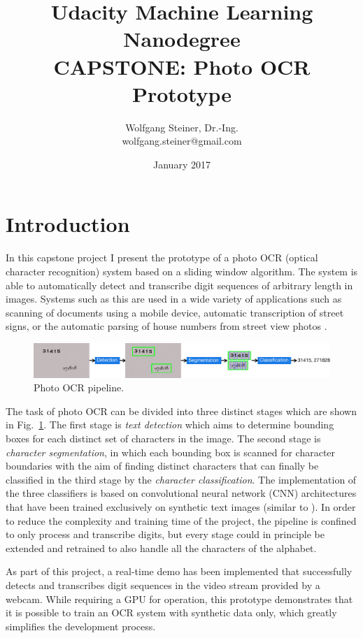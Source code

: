 \documentclass[12pt]{article}
\title{Udacity Machine Learning Nanodegree\\ CAPSTONE: Photo OCR Prototype}
\author{Wolfgang Steiner, Dr.-Ing. \\ \small{wolfgang.steiner@gmail.com}}
\date{January 2017}
\newcommand\figref[1]{Fig.~\ref{fig:#1}}
\begin{document}
\maketitle
\section{Introduction}
In this capstone project I present the prototype of a photo OCR (optical character recognition)
system based on a sliding window algorithm. The system is able to automatically detect and transcribe
digit sequences of arbitrary length in images. Systems such as this are used in a wide variety of applications
such as scanning of documents using a mobile device, automatic transcription of street signs, or
the automatic parsing of house numbers from street view photos \cite{Goodfellow2013}.

\begin{figure}
    \centering
    \includegraphics[scale=0.8]{fig/Pipeline}
    \caption{Photo OCR pipeline.}
    \label{fig:pipeline}
\end{figure}


The task of photo OCR can be divided into three distinct stages which are shown in \figref{pipeline}.
The first stage is \emph{text detection} which aims to determine bounding boxes for each
distinct set of characters in the image. The second stage is \emph{character segmentation}, in which
each bounding box is scanned for character boundaries with the aim of finding distinct characters
that can finally be classified in the third stage by the \emph{character classification}.
The implementation of the three classifiers is based on convolutional neural network (CNN)
architectures that have been trained exclusively on synthetic text images (similar to \cite{Jaderberg2016}).
In order to reduce the complexity and training time of the project, the pipeline is confined to
only process and transcribe digits, but every stage could in principle be extended and retrained
to also handle all the characters of the alphabet.


As part of this project, a real-time demo has been implemented that successfully detects
and transcribes digit sequences in the video stream provided by a webcam. While requiring
a GPU for operation, this prototype demonstrates that it is possible to train an OCR system
with synthetic data only, which greatly simplifies the development process.
\end{document}
